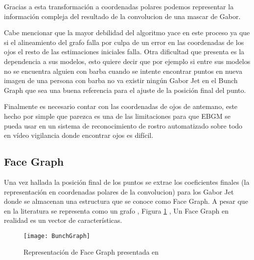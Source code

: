 Gracias a esta transformación a coordenadas polares podemos representar la información compleja del resultado de la convolucion de una mascar de Gabor. 


Cabe mencionar que la mayor debilidad del algoritmo yace en este proceso ya que si el alineamiento del grafo falla por culpa de un error en las coordenadas de los ojos el resto de las estimaciones iniciales falla. %
Otra dificultad que presenta es la dependencia a sus modelos, esto quiere decir que por ejemplo si entre sus modelos no se encuentra alguien con barba cuando se intente encontrar puntos en nueva imagen de una persona con barba no va existir ningún Gabor Jet en el Bunch Graph que sea una buena referencia para el ajuste de la posición final del punto.

Finalmente es necesario contar con las coordenadas de ojos de antemano, este hecho por simple que parezca es una de las limitaciones para que \ac{EBGM} se pueda usar en un sistema de reconocimiento de rostro automatizado sobre todo en vídeo vigilancia donde encontrar ojos es difícil.

\subsection{Face Graph}
Una vez hallada la posición final de los puntos se extrae los coeficientes finales (la representación en coordenadas polares de la convolucion) para los Gabor Jet donde se almacenan una estructura que se conoce como Face Graph. A pesar que en la literatura se representa como un grafo , Figura \ref{im:FaceGraph} , Un Face Graph en realidad es un vector de características.
\begin{figure}[h]
\center
\texttt{[image: BunchGraph]}
\caption{Representación de Face Graph presentada en \cite{wiskott1997face} }
\label{im:FaceGraph}
\end{figure}


